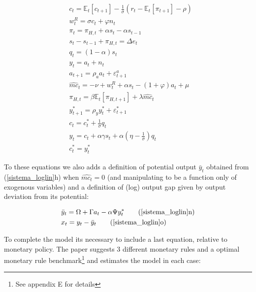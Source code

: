 \documentclass{article}
\newcommand{\Et}{\mathbb{E}_t}
\begin{document}
\begin{subequations}
\label{sistema_loglin}
    \begin{align}
        &c_t = \Et[c_{t+1}] - \frac{1}{\sigma} (r_t - \Et[\pi_{t+1}] - \rho)\\
        & w_t^R = \sigma c_t + \varphi n_t \\
        &\pi_t = \pi_{H,t} + \alpha s_t - \alpha s_{t-1}\\
        &s_{t} - s_{t-1} + \pi_{H,t} = \Delta e_t \\
        &q_t = (1-\alpha) s_t\\
        &y_t = a_t +  n_t\\
        &a_{t+1} = \rho_a a_t + \varepsilon^a_{t+1}\\
        &\hat{mc}_{t} = -\nu + w_t^R + \alpha s_t - (1+ \varphi )a_t + \mu\\
        & \pi_{H,t} = \beta \Et[\pi_{H,t+1}] + \lambda \hat{mc}_t\\
        &y^*_{t+1} = \rho_y y^*_t + \varepsilon^*_{t+1}\\
        &c_t = c_t^* + \frac{1}{\sigma} q_t\\
        &y_t = c_t + \alpha \gamma s_t + \alpha \left( \eta - \frac{1}{\sigma} \right) q_t\\
        &c_t^* = y_t^*
    \end{align}
\end{subequations}

To these equations we also adds a definition of potential output $\bar y_t$ obtained from (\ref{sistema_loglin}h) when $\hat{mc_t} = 0$ (and manipulating to be a function only of exogenous variables) and a definition of (log) output gap given by output deviation from its potential:

\begin{subequations}
    \begin{align}
        &\bar y_t = \Omega + \Gamma a_t - \alpha \Psi y_t^* \tag{\ref{sistema_loglin}n}\\
        &x_t = y_t - \bar y_t \tag{\ref{sistema_loglin}o}
    \end{align}
\end{subequations}

To complete the model its necessary to include a last equation, relative to monetary policy. The paper suggests 3 different monetary rules and a optimal monetary rule benchmark\footnote{See appendix E for details} and estimates the model in each case:
\end{document}
